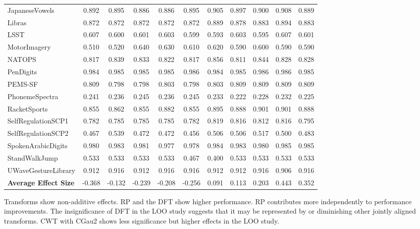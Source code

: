 \begin{table}[h]
{\begin{tabular}{lcccccccccc}
    JapaneseVowels & 0.892 & 0.895 & 0.886 & 0.886 & 0.895 & 0.905 & 0.897 & 0.900 & 0.908 & 0.889 \\
    Libras & 0.872 & 0.872 & 0.872 & 0.872 & 0.872 & 0.889 & 0.878 & 0.883 & 0.894 & 0.883 \\
    LSST & 0.607 & 0.600   & 0.601 & 0.603 & 0.599 & 0.593 & 0.603 & 0.595 & 0.607 & 0.601 \\
    MotorImagery & 0.510 & 0.520 & 0.640 & 0.630 & 0.610 & 0.620 & 0.590 & 0.600 & 0.590 & 0.590 \\
    NATOPS & 0.817 & 0.839 & 0.833 & 0.822 & 0.817 & 0.856 & 0.811 & 0.844 & 0.828 & 0.828 \\
    PenDigits & 0.984 & 0.985 & 0.985 & 0.985 & 0.986 & 0.984 & 0.985 & 0.986 & 0.986 & 0.985 \\
    PEMS-SF & 0.809 & 0.798 & 0.798 & 0.803 & 0.798 & 0.803 & 0.809 & 0.809 & 0.809 & 0.809 \\
    PhonemeSpectra & 0.241 & 0.236 & 0.245 & 0.236 & 0.245 & 0.233 & 0.222 & 0.228 & 0.232 & 0.225 \\
    RacketSports & 0.855 & 0.862 & 0.855 & 0.882 & 0.855 & 0.895 & 0.888 & 0.901 & 0.901 & 0.888 \\
    SelfRegulationSCP1 & 0.782 & 0.785 & 0.785 & 0.785 & 0.782 & 0.819 & 0.816 & 0.812 & 0.816 & 0.795 \\
    SelfRegulationSCP2 & 0.467 & 0.539 & 0.472 & 0.472 & 0.456 & 0.506 & 0.506 & 0.517 & 0.500 & 0.483 \\
    SpokenArabicDigits & 0.980 & 0.983 & 0.981 & 0.977 & 0.978 & 0.984 & 0.983 & 0.980 & 0.985 & 0.985 \\
    StandWalkJump & 0.533 & 0.533 & 0.533 & 0.533 & 0.467 & 0.400 & 0.533 & 0.533 & 0.533 & 0.533 \\
    UWaveGestureLibrary & 0.912 & 0.916 & 0.912 & 0.916 & 0.916 & 0.912 & 0.912 & 0.916 & 0.906 & 0.916 \\
    \midrule
    \textbf{Average Effect Size} & -0.368 & -0.132 & -0.239 & -0.208 & -0.256 & 0.091 & 0.113 & 0.203 & 0.443 & 0.352 \\
    \bottomrule
    \end{tabular}}
    \label{tab:performance_metrics}
\end{table}
    

Transforms show non-additive effects. RP and the DFT show higher performance. RP contributes more independently to performance improvements. The insignificance of DFT in the LOO study suggests that it may be represented by or diminishing other jointly aligned transforms. CWT with CGau2 shows less significance but higher effects in the LOO study.

